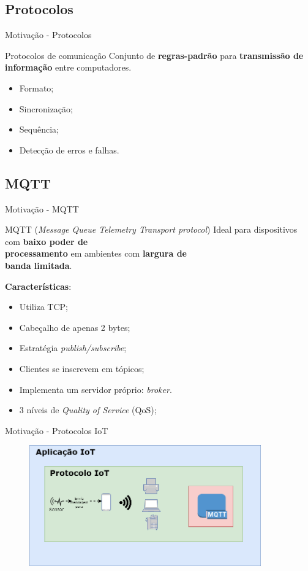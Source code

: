 \documentclass[12pt,xcolor={usenames,dvipsnames}]{beamer}
\begin{document}
\subsection{Protocolos}
\begin{frame}{Motivação - Protocolos}
\begin{beamerboxesrounded}{Protocolos de comunicação}
	Conjunto de \textbf{regras-padrão} para \textbf{transmissão de \\ informação} entre computadores.
	\begin{itemize}
		\item Formato;
		\item Sincronização;
		\item Sequência;
		\item Detecção de erros e falhas.
	\end{itemize}
\end{beamerboxesrounded}
\end{frame}

\subsection{MQTT}
\begin{frame}{Motivação - MQTT}
\begin{beamerboxesrounded}{MQTT (\textit{Message Queue Telemetry Transport protocol})}
	Ideal para dispositivos com \textbf{baixo poder de \\ processamento} em ambientes com \textbf{largura de \\ banda limitada}.
\end{beamerboxesrounded}
\textbf{Características}:
\begin{itemize}
	\item Utiliza TCP;
	\item Cabeçalho de apenas 2 bytes;
	\item Estratégia \textit{publish/subscribe};
	\item Clientes se inscrevem em tópicos;
	\item Implementa um servidor próprio: \textit{broker}.
		\item 3 níveis de \textit{Quality of Service} (QoS);
\end{itemize}
\end{frame}

\begin{frame}{Motivação - Protocolos IoT}
\begin{figure}[ht]
	\centering
	\includegraphics[width=10cm]{./figuras/protocolo_diagrama.png}
\end{figure}    
\end{frame}
\end{document}
